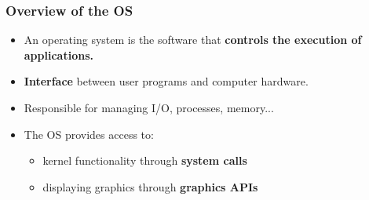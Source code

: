 \begin{frame}
\frametitle{Overview of the OS}
\begin{theorembox}
\begin{itemize}
    \setlength{\itemsep}{8pt}
    \item An operating system is the software that \textbf{controls the execution of applications.}
    \item \textbf{Interface} between user programs and computer hardware.
    \item Responsible for managing I/O, processes, memory...
    \item The OS provides access to: \cite{ArpaciDusseau18-Book}
    \vspace{3pt}
    \begin{itemize}
        \setlength{\itemsep}{3pt}
        \item kernel functionality through \textbf{system calls}
        \item displaying graphics through \textbf{graphics APIs}
    \end{itemize}
\end{itemize}
\end{theorembox}

\end{frame}